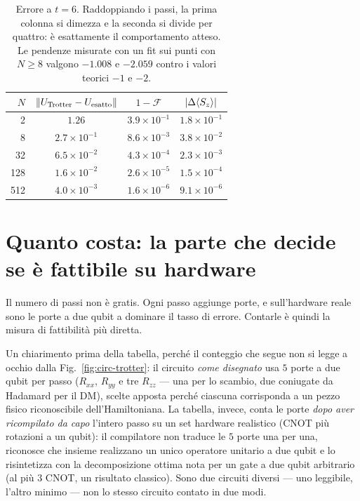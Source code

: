 \documentclass[11pt,a4paper]{article}
\begin{document}
\FloatBarrier

\begin{table}[htbp]
\centering
\small
\renewcommand{\arraystretch}{1.25}
\begin{tabular}{@{}rccc@{}}
\toprule
\rowcolor{grigetto}
$N$ & $\lVert U_{\rm Trotter}-U_{\rm esatto}\rVert$ & $1-\mathcal F$ & $\lvert\Delta\langle S_z \rangle\rvert$ \\
\midrule
  2 & $1.26$ & $3.9\times10^{-1}$ & $1.8\times10^{-1}$ \\
  8 & $2.7\times10^{-1}$ & $8.6\times10^{-3}$ & $3.8\times10^{-2}$ \\
 32 & $6.5\times10^{-2}$ & $4.3\times10^{-4}$ & $2.3\times10^{-3}$ \\
128 & $1.6\times10^{-2}$ & $2.6\times10^{-5}$ & $1.5\times10^{-4}$ \\
512 & $4.0\times10^{-3}$ & $1.6\times10^{-6}$ & $9.1\times10^{-6}$ \\
\bottomrule
\end{tabular}
\caption{Errore a $t=6$. Raddoppiando i passi, la prima colonna si dimezza e la
seconda si divide per quattro: è esattamente il comportamento atteso. Le
pendenze misurate con un fit sui punti con $N\ge8$ valgono $-1.008$ e $-2.059$
contro i valori teorici $-1$ e $-2$.}
\end{table}

\FloatBarrier

\section{Quanto costa: la parte che decide se è fattibile su hardware}

Il numero di passi non è gratis. Ogni passo aggiunge porte, e sull'hardware
reale sono le porte a due qubit a dominare il tasso di errore. Contarle è quindi
la misura di fattibilità più diretta.

Un chiarimento prima della tabella, perché il conteggio che segue non si legge
a occhio dalla Fig.~\ref{fig:circ-trotter}: il circuito \emph{come disegnato} usa $5$
porte a due qubit per passo ($R_{xx}$, $R_{yy}$ e tre $R_{zz}$ --- una per lo
scambio, due coniugate da Hadamard per il DM), scelte apposta perché ciascuna
corrisponda a un pezzo fisico riconoscibile dell'Hamiltoniana. La tabella,
invece, conta le porte \emph{dopo aver ricompilato da capo} l'intero passo su
un set hardware realistico (CNOT più rotazioni a un qubit): il compilatore non
traduce le $5$ porte una per una, riconosce che insieme realizzano un unico
operatore unitario a due qubit e lo risintetizza con la decomposizione ottima
nota per un gate a due qubit arbitrario (al più $3$ CNOT, un risultato
classico). Sono due circuiti diversi --- uno leggibile, l'altro minimo --- non
lo stesso circuito contato in due modi.
\end{document}
